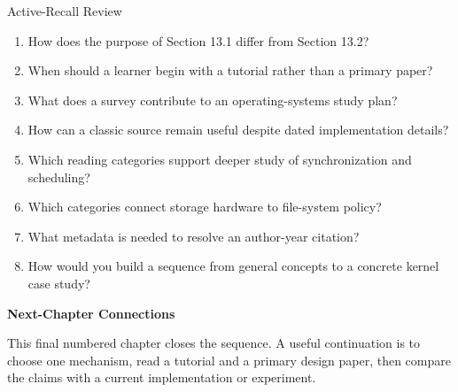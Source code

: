 \documentclass[10pt,letterpaper]{article}
\begin{document}
\enlargethispage{2\baselineskip}
\begin{studybox}{Active-Recall Review}
\small
\begin{enumerate}
  \item How does the purpose of Section 13.1 differ from Section 13.2?
  \item When should a learner begin with a tutorial rather than a primary paper?
  \item What does a survey contribute to an operating-systems study plan?
  \item How can a classic source remain useful despite dated implementation details?
  \item Which reading categories support deeper study of synchronization and scheduling?
  \item Which categories connect storage hardware to file-system policy?
  \item What metadata is needed to resolve an author-year citation?
  \item How would you build a sequence from general concepts to a concrete kernel case study?
\end{enumerate}
\end{studybox}

\par\medskip
{\color{navy}\bfseries Next-Chapter Connections}\par\smallskip
This final numbered chapter closes the sequence. A useful continuation is to choose one mechanism, read a tutorial and a primary design paper, then compare the claims with a current implementation or experiment.
\normalsize
\end{document}
